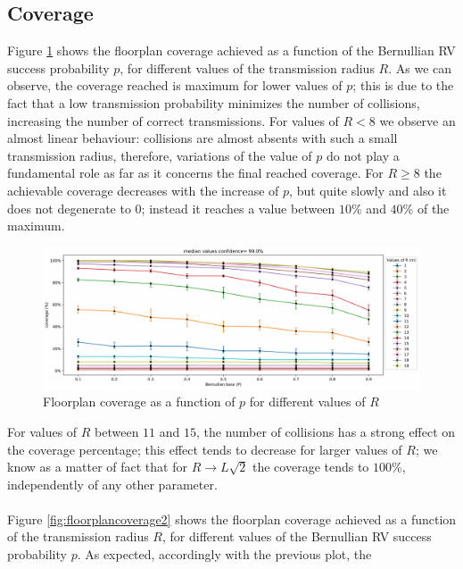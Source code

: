 \subsection{Coverage}
Figure \ref{fig:floorplancoverage1} shows the floorplan coverage achieved as a
function of the Bernullian RV success probability $p$, for different values of
the transmission radius $R$. As we can observe, the coverage reached is maximum
for lower values of $p$; this is due to the fact that a low transmission
probability minimizes the number of collisions, increasing the number of correct
transmissions. For values of $R < 8$ we observe an almost linear behaviour:
collisions are almost absents with such a small transmission radius, therefore,
variations of the value of $p$ do not play a fundamental role as far as it
concerns the final reached coverage. For $R \geq 8$ the achievable coverage
decreases with the increase of $p$, but quite slowly and also it does not
degenerate to $0$; instead it reaches a value between $10$\% and $40$\% of the
maximum.
\begin{figure}[H]
    \begin{center}
        \includegraphics[scale=.42]{img/Big_CovP_median.pdf}
    \end{center}
    \vspace*{-0.5cm}
    \caption{Floorplan coverage as a function of $p$ for different values of $R$}
    \label{fig:floorplancoverage1}
\end{figure}
\noindent
For values of $R$ between $11$ and $15$, the number of collisions has a strong
effect on the coverage percentage; this effect tends to decrease for larger
values of $R$; we know as a matter of fact that for $R \to L\sqrt{2}$ the
coverage tends to $100$\%, independently of any other parameter.\\
\\
Figure \ref{fig:floorplancoverage2} shows the floorplan coverage achieved as a
function of the transmission radius $R$, for different values of the Bernullian
RV success probability $p$. As expected, accordingly with the previous plot, the
